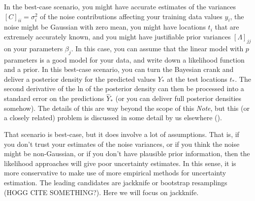 \documentclass[12pt,letterpaper]{article}
\newcommand{\documentname}{\textsl{Note}}
\begin{document}
In the best-case scenario, you might have accurate estimates of the variances $[C]_{ii} = \sigma_i^2$ of the noise contributions affecting your training data values $y_i$, the noise might be Gaussian with zero mean, you might have locations $t_i$ that are extremely accurately known, and you might have justifiable prior variances $[\Lambda]_{jj}$ on your parameters $\beta_j$.
In this case, you can assume that the linear model with $p$ parameters is a good model for your data, and write down a likelihood function and a prior.
In this best-case scenario, you can turn the Bayesian crank and deliver a posterior density for the predicted values $Y_\ast$ at the test locations $t_\ast$.
The second derivative of the ln of the posterior density can then be processed into a standard error on the predictions $\hat{Y}_\ast$ (or you can deliver full posterior densities somehow).
The details of this are way beyond the scope of this \documentname, but this (or a closely related) problem is discussed in some detail by us elsewhere (\citealt{products}).

That scenario is best-case, but it does involve a lot of assumptions.
That is, if you don't trust your estimates of the noise variances, or if you think the noise might be non-Gaussian, or if you don't have plausible prior information, then the likelihood approaches will give poor uncertainty estimates.
In this sense, it is more conservative to make use of more empirical methods for uncertainty estimation.
The leading candidates are jackknife or bootstrap resamplings (HOGG CITE SOMETHING?).
Here we will focus on jackknife.
\end{document}
